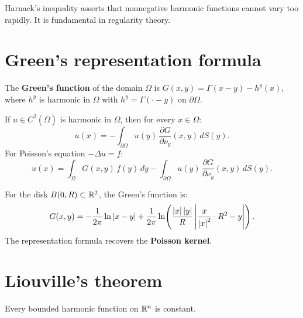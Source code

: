 \begin{remark}
Harnack's inequality asserts that nonnegative harmonic functions cannot
vary too rapidly. It is fundamental in regularity theory.
\end{remark}

\section{Green's representation formula}

\begin{definition}
The \textbf{Green's function} of the domain $\Omega$ is
$G(x,y) = \Gamma(x-y) - h^y(x)$, where $h^y$ is harmonic in $\Omega$
with $h^y = \Gamma(\cdot - y)$ on $\partial\Omega$.
\end{definition}

\begin{theorem}
If $u \in C^2(\overline{\Omega})$ is harmonic in $\Omega$, then for
every $x \in \Omega$:
\begin{equation}\label{eq:green_representation}
    u(x) = -\int_{\partial\Omega} u(y)\, \frac{\partial G}{\partial \nu_y}(x,y)\, dS(y).
\end{equation}
For Poisson's equation $-\Delta u = f$:
\begin{equation}\label{eq:poisson_representation}
    u(x) = \int_\Omega G(x,y)\, f(y)\, dy
    - \int_{\partial\Omega} u(y)\, \frac{\partial G}{\partial \nu_y}(x,y)\, dS(y).
\end{equation}
\end{theorem}

\begin{example}
For the disk $B(0,R) \subset \mathbb{R}^2$, the Green's function is:
\[
    G(x,y) = -\frac{1}{2\pi}\ln\left| x-y \right|
    + \frac{1}{2\pi}\ln\!\left(\frac{\left| x \right|\left| y \right|}{R}
    \left| \frac{x}{\left| x \right|^2} \cdot R^2 - y \right|\right).
\]
The representation formula recovers the \textbf{Poisson kernel}.
\end{example}

\section{Liouville's theorem}

\begin{theorem}
Every bounded harmonic function on $\mathbb{R}^n$ is constant.
\end{theorem}

